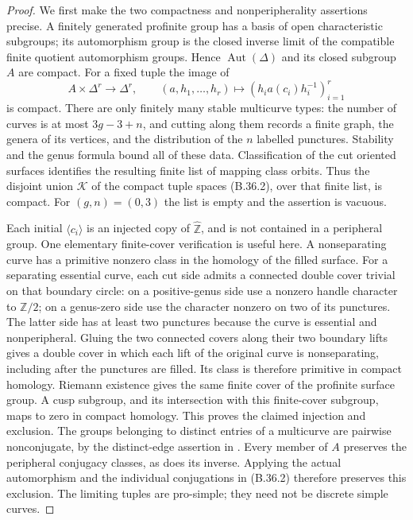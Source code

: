 \documentclass[11pt,oneside]{article}
\begin{document}
\begin{proof}
We first make the two compactness and nonperipherality
assertions precise. A finitely generated profinite group has
a basis of open characteristic subgroups; its automorphism
group is the closed inverse limit of the compatible finite
quotient automorphism groups. Hence $\operatorname{Aut}(\Delta)$
and its closed subgroup $A$ are compact. For a fixed tuple the
image of
\[
 A\times\Delta^r\longrightarrow\Delta^r,\qquad
 (a,h_1,\ldots,h_r)\longmapsto
 (h_i a(c_i)h_i^{-1})_{i=1}^r
 \tag{B.36.2}
\]
is compact. There are only finitely many stable multicurve
types: the number of curves is at most $3g-3+n$, and cutting
along them records a finite graph, the genera of its vertices,
and the distribution of the $n$ labelled punctures. Stability
and the genus formula bound all of these data. Classification
of the cut oriented surfaces identifies the resulting finite
list of mapping class orbits. Thus the disjoint union
$\mathcal K$ of the compact tuple spaces (B.36.2), over that
finite list, is compact. For $(g,n)=(0,3)$ the list is empty
and the assertion is vacuous.

Each initial $\langle c_i\rangle$ is an injected copy of
$\widehat{\mathbb Z}$, and is not contained in a peripheral
group. One elementary finite-cover verification is useful
here. A nonseparating curve has a primitive nonzero class
in the homology of the filled surface. For a separating
essential curve, each cut side admits a connected double
cover trivial on that boundary circle: on a positive-genus
side use a nonzero handle character to $\mathbb Z/2$; on
a genus-zero side use the character nonzero on two of its
punctures. The latter side has at least two punctures because
the curve is essential and nonperipheral. Gluing the two
connected covers along their two boundary lifts gives a
double cover in which each lift of the original curve is
nonseparating, including after the punctures are filled.
Its class is therefore primitive in compact homology.
Riemann existence gives the same finite cover of the
profinite surface group. A cusp subgroup, and its intersection
with this finite-cover subgroup, maps to zero in compact
homology. This proves the claimed injection and exclusion.
The groups belonging to distinct entries of a multicurve
are pairwise nonconjugate, by the distinct-edge assertion
in \cite[Proposition 1.2]{F-MochizukiCombinatorial}.
Every member of $A$ preserves the peripheral conjugacy
classes, as does its inverse. Applying the actual
automorphism and the individual conjugations in (B.36.2)
therefore preserves this exclusion. The limiting tuples
are pro-simple; they need not be discrete simple curves.


\end{proof}
\end{document}
